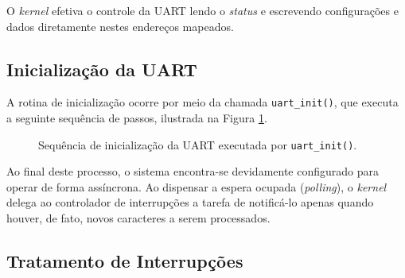 O \textit{kernel} efetiva o controle da UART lendo o \textit{status} e escrevendo configurações e dados diretamente nestes endereços mapeados.

\subsection{Inicialização da UART}
A rotina de inicialização ocorre por meio da chamada \texttt{uart\_init()}, que executa a seguinte sequência de passos, ilustrada na Figura \ref{fig:uart-init}.

\begin{figure}[htbp]
    \centering
    \caption{Sequência de inicialização da UART executada por \texttt{uart\_init()}.}
    \label{fig:uart-init}
\end{figure}

Ao final deste processo, o sistema encontra-se devidamente configurado para operar de forma assíncrona. Ao dispensar a espera ocupada (\textit{polling}), o \textit{kernel} delega ao controlador de interrupções a tarefa de notificá-lo apenas quando houver, de fato, novos caracteres a serem processados.
\subsection{Tratamento de Interrupções}


